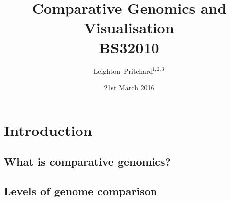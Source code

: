 

%



\title[Comparative Genomics and Visualisation] %
{Comparative Genomics and \\ Visualisation \\
BS32010 \\}
\author[Pritchard] %
{Leighton~Pritchard$^{1,2,3}$}
\date[21st March 2016] %
{21st March 2016}
\subject{Bioinformatics, Genomics, Bacteria, Sequencing, Microbiology, Microbes, Comparative Genomics, Visualisation}





\frame[plain]{\titlepage}



\section{Introduction}

\subsection{What is comparative genomics?}

\subsection{Levels of genome comparison}



